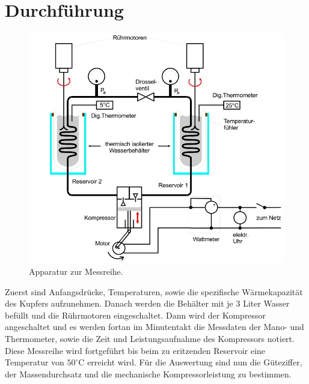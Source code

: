 \section{Durchführung}
\label{sec:Durchführung}
\begin{figure}
  \centering
  \includegraphics{data/Abb2.jpg}
  \caption{Apparatur zur Messreihe. \cite{AnleitungV206}}
  \label{fig:Abb2}
\end{figure}
\noindent
Zuerst sind Anfangsdrücke, Temperaturen, sowie die spezifische Wärmekapazität des Kupfers aufzunehmen.
Danach werden die Behälter mit je 3 Liter Wasser befüllt und die Rührmotoren eingeschaltet.
Dann wird der Kompressor angeschaltet und es werden fortan im Minutentakt die Messdaten der Mano- und Thermometer, sowie die Zeit und Leistungsaufnahme des Kompressors notiert.
Diese Messreihe wird fortgeführt bis beim zu eritzenden Reservoir eine Temperatur von $50^\circ\text{C}$ erreicht wird.
Für die Auswertung sind nun die Güteziffer, der Massendurchsatz und die mechanische Kompressorleistung zu bestimmen.
